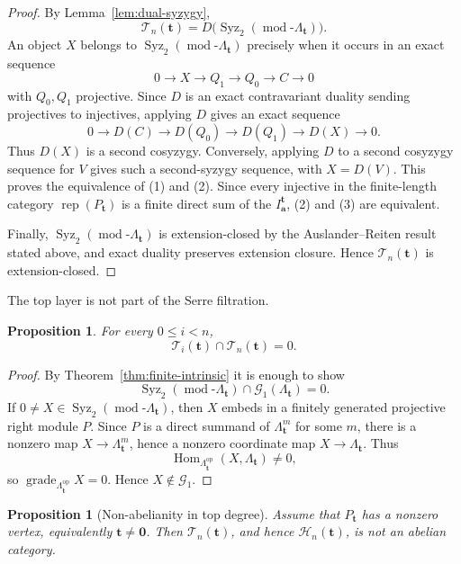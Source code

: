 \documentclass[12pt,reqno]{amsart}
\newtheorem{proposition}[theorem]{Proposition}
\theoremstyle{definition}
\theoremstyle{remark}
\newcommand{\Rep}{\operatorname{rep}}
\newcommand{\Hom}{\operatorname{Hom}}
\newcommand{\grade}{\operatorname{grade}}
\newcommand{\modcat}{\operatorname{mod}}
\begin{document}
\begin{proof}
By Lemma~\ref{lem:dual-syzygy},
\[
\mathcal T_n(\mathbf t)
=
D\bigl(\operatorname{Syz}_2(\modcat\text{-}\Lambda_{\mathbf t})\bigr).
\]
An object $X$ belongs to $\operatorname{Syz}_2(\modcat\text{-}\Lambda_{\mathbf t})$ precisely when it occurs in an exact sequence
\[
0\longrightarrow X\longrightarrow Q_1\longrightarrow Q_0
\longrightarrow C\longrightarrow0
\]
with $Q_0,Q_1$ projective.  Since $D$ is an exact contravariant duality sending projectives to injectives, applying $D$ gives an exact sequence
\[
0\longrightarrow D(C)\longrightarrow D(Q_0)\longrightarrow D(Q_1)
\longrightarrow D(X)\longrightarrow0.
\]
Thus $D(X)$ is a second cosyzygy.  Conversely, applying $D$ to a second
cosyzygy sequence for $V$ gives such a second-syzygy sequence, with
$X=D(V)$.  This proves the equivalence of (1) and (2).  Since every injective
in the finite-length category $\Rep(P_{\mathbf t})$ is a finite direct sum of
the $I^{\mathbf t}_{\mathbf a}$, (2) and (3) are equivalent.

Finally, $\operatorname{Syz}_2(\modcat\text{-}\Lambda_{\mathbf t})$ is extension-closed by the Auslander--Reiten result stated above, and exact duality preserves extension closure.  Hence $\mathcal T_n(\mathbf t)$ is extension-closed.
\end{proof}

The top layer is not part of the Serre filtration.

\begin{proposition}\label{prop:top-disjoint}
For every $0\le i<n$,
\[
\mathcal T_i(\mathbf t)\cap\mathcal T_n(\mathbf t)=0.
\]
\end{proposition}

\begin{proof}
By Theorem~\ref{thm:finite-intrinsic} it is enough to show
\[
\operatorname{Syz}_2(\modcat\text{-}\Lambda_{\mathbf t})
\cap
\mathcal G_1(\Lambda_{\mathbf t})=0.
\]
If $0\ne X\in\operatorname{Syz}_2(\modcat\text{-}\Lambda_{\mathbf t})$, then $X$ embeds in a finitely generated projective right module $P$.  Since $P$ is a direct summand of $\Lambda_{\mathbf t}^m$ for some $m$, there is a nonzero map $X\to\Lambda_{\mathbf t}^m$, hence a nonzero coordinate map $X\to\Lambda_{\mathbf t}$.  Thus
\[
\Hom_{\Lambda_{\mathbf t}^{\mathrm{op}}}(X,\Lambda_{\mathbf t})\ne0,
\]
so $\grade_{\Lambda_{\mathbf t}^{\mathrm{op}}}X=0$.  Hence $X\notin\mathcal G_1$.
\end{proof}

\begin{proposition}[Non-abelianity in top degree]\label{prop:top-nonabelian}
Assume that $P_{\mathbf t}$ has a nonzero vertex, equivalently
$\mathbf t\ne\mathbf0$.  Then $\mathcal T_n(\mathbf t)$, and hence
$\mathcal H_n(\mathbf t)$, is not an abelian category.
\end{proposition}
\end{document}
